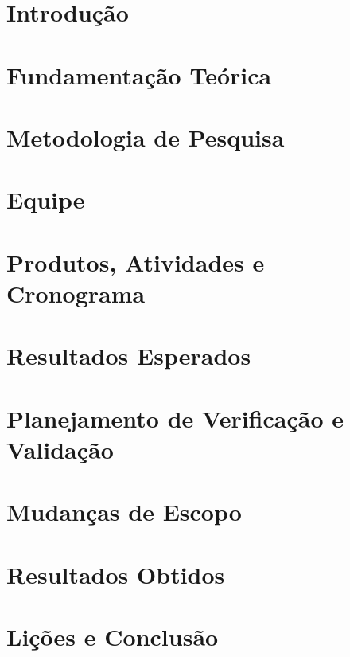 \section{Introdução} %
\label{sec:introdu_o}
 

\section{Fundamentação Teórica} %
\label{sec:fundamentacao}
 

\section{Metodologia de Pesquisa} %
\label{sec:metodologia}
 

\section{Equipe} %
\label{sec:equipe}
 

\section{Produtos, Atividades e Cronograma} %
\label{sec:produtos}
 

\section{Resultados Esperados} %
\label{sec:resultados_esperados}
 

\section{Planejamento de Verificação e Validação} %
\label{sec:planejamento}
 

\section{Mudanças de Escopo} %
\label{sec:mudan_as_de_escopo}


\section{Resultados Obtidos} %
\label{sec:resultados_obtidos}


\section{Lições e Conclusão} %
\label{sec:Conclusao}

